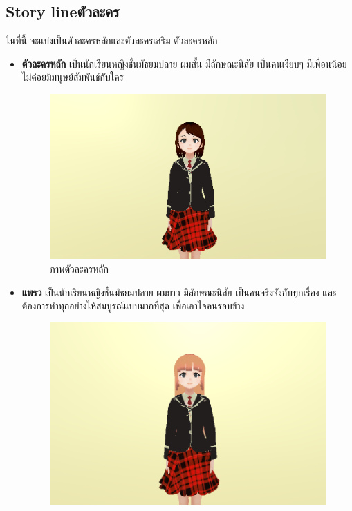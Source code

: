 \subsection{\ifenglish Story line\else ตัวละคร\fi }
ในที่นี้ จะแบ่งเป็นตัวละครหลักและตัวละครเสริม
\subitem ตัวละครหลัก
\begin{itemize}
    \item \textbf{ตัวละครหลัก} เป็นนักเรียนหญิงชั้นมัธยมปลาย ผมสั้น มีลักษณะนิสัย เป็นคนเงียบๆ มีเพื่อนน้อย ไม่ค่อยมีมนุษย์สัมพันธ์กับใคร
          \begin{figure}[h]
              \centering
              \includegraphics[scale=0.5]{Images/demo_character.jpg}
              \caption{ภาพตัวละครหลัก}\label{MainCharacter}
          \end{figure}
    \item \textbf{แพรว} เป็นนักเรียนหญิงชั้นมัธยมปลาย ผมยาว มีลักษณะนิสัย เป็นคนจริงจังกับทุกเรื่อง และต้องการทำทุกอย่างให้สมบูรณ์แบบมากที่สุด เพื่อเอาใจคนรอบข้าง
          \begin{figure}[h]
              \centering
              \includegraphics[scale=0.5]{Images/demogame_character.jpg}

\end{figure}
\end{itemize}
